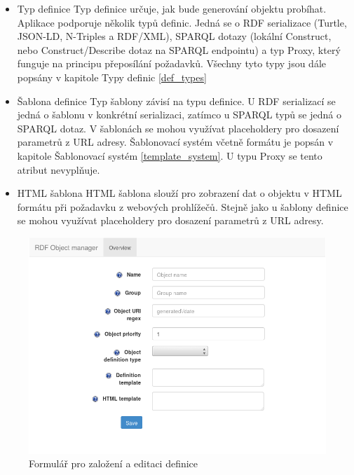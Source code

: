 \documentclass[thesis=B,czech]{FITthesis}[2012/06/26]
\begin{document}
\begin{itemize}
      \item Typ definice
	\subitem Typ definice určuje, jak bude generování objektu probíhat. Aplikace podporuje několik typů definic. Jedná se o RDF serializace (Turtle, JSON-LD, 
	N-Triples a RDF/XML), SPARQL dotazy (lokální Construct, nebo Construct/Describe dotaz na SPARQL endpointu) a typ Proxy, 
	který funguje na principu přeposílání požadavků.
	Všechny tyto typy jsou dále popsány v kapitole Typy definic \ref{def_types}
	
    \item Šablona definice
      \subitem Typ šablony závisí na typu definice. U RDF serializací se jedná o šablonu v konkrétní serializaci, zatímco u SPARQL typů
      se jedná o SPARQL dotaz. V šablonách se mohou využívat placeholdery pro dosazení parametrů z URL adresy. Šablonovací systém včetně formátu je popsán v kapitole
      Šablonovací systém \ref{template_system}. U typu Proxy se tento atribut nevyplňuje.
      
      \item HTML šablona
      \subitem HTML šablona slouží pro zobrazení dat o objektu v HTML formátu při požadavku z webových prohlížečů. Stejně jako u šablony definice se mohou využívat
      placeholdery pro dosazení parametrů z URL adresy.	
	
    \end{itemize}
    \begin{figure}\centering
 	\includegraphics[width=\textwidth]{web_create}
 	\caption[Formulář pro založení a editaci definice]{Formulář pro založení a editaci definice}\label{web_create}		
  \end{figure}
    
\end{document}
